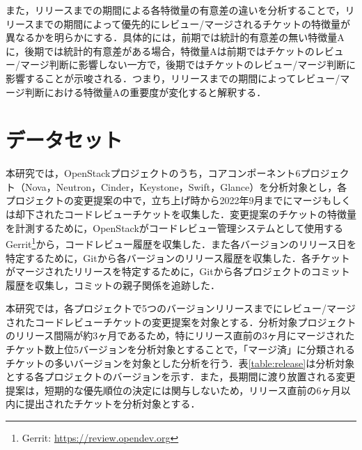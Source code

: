 \documentclass[submit]{ipsj}
\begin{document}
また，リリースまでの期間による各特徴量の有意差の違いを分析することで，リリースまでの期間によって優先的にレビュー/マージされるチケットの特徴量が異なるかを明らかにする．具体的には，前期では統計的有意差の無い特徴量Aに，後期では統計的有意差がある場合，特徴量Aは前期ではチケットのレビュー/マージ判断に影響しない一方で，後期ではチケットのレビュー/マージ判断に影響することが示唆される．つまり，リリースまでの期間によってレビュー/マージ判断における特徴量Aの重要度が変化すると解釈する．


\section{データセット}\label{sec:dataset}
本研究では，OpenStackプロジェクトのうち，コアコンポーネント6プロジェクト（Nova，Neutron，Cinder，Keystone，Swift，Glance）を分析対象とし，各プロジェクトの変更提案の中で，立ち上げ時から2022年9月までにマージもしくは却下されたコードレビューチケットを収集した．変更提案のチケットの特徴量を計測するために，OpenStackがコードレビュー管理システムとして使用するGerrit\footnote{Gerrit: \url{https://review.opendev.org}}から，コードレビュー履歴を収集した．また各バージョンのリリース日を特定するために，Gitから各バージョンのリリース履歴を収集した．各チケットがマージされたリリースを特定するために，Gitから各プロジェクトのコミット履歴を収集し，コミットの親子関係を追跡した．

本研究では，各プロジェクトで5つのバージョンリリースまでにレビュー/マージされたコードレビューチケットの変更提案を対象とする．分析対象プロジェクトのリリース間隔が約3ヶ月であるため，特にリリース直前の3ヶ月にマージされたチケット数上位5バージョンを分析対象とすることで，「マージ済」に分類されるチケットの多いバージョンを対象とした分析を行う．表\ref{table:release}は分析対象とする各プロジェクトのバージョンを示す．また，長期間に渡り放置される変更提案は，短期的な優先順位の決定には関与しないため，リリース直前の6ヶ月以内に提出されたチケットを分析対象とする．
\end{document}
